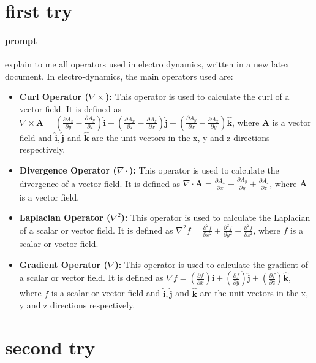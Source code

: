 \documentclass{article}
\begin{document}
\section{first try} %
\paragraph{prompt} %
explain to me all operators used in electro dynamics, written in a new latex document.
In electro-dynamics, the main operators used are:
\begin{itemize}
    \item \textbf{Curl Operator ($\nabla \times$):} This operator is used to calculate the curl of a vector field. It is defined as $\nabla \times \textbf{A}=\left(\frac{\partial A_z}{\partial y}-\frac{\partial A_y}{\partial z}\right)\hat{\textbf{i}} + \left(\frac{\partial A_x}{\partial z}-\frac{\partial A_z}{\partial x}\right)\hat{\textbf{j}} + \left(\frac{\partial A_y}{\partial x}-\frac{\partial A_x}{\partial y}\right)\hat{\textbf{k}}$, where $\textbf{A}$ is a vector field and $\hat{\textbf{i}},\hat{\textbf{j}}$ and $\hat{\textbf{k}}$ are the unit vectors in the x, y and z directions respectively. 
    \item \textbf{Divergence Operator ($\nabla \cdot$):} This operator is used to calculate the divergence of a vector field. It is defined as $\nabla \cdot \textbf{A}=\frac{\partial A_x}{\partial x}+\frac{\partial A_y}{\partial y}+\frac{\partial A_z}{\partial z}$, where $\textbf{A}$ is a vector field.
    \item \textbf{Laplacian Operator ($\nabla^2$):} This operator is used to calculate the Laplacian of a scalar or vector field. It is defined as $\nabla^2 f=\frac{\partial^2 f}{\partial x^2}+\frac{\partial^2 f}{\partial y^2}+\frac{\partial^2 f}{\partial z^2}$, where $f$ is a scalar or vector field.
    \item \textbf{Gradient Operator ($\nabla$):} This operator is used to calculate the gradient of a scalar or vector field. It is defined as $\nabla f=\left(\frac{\partial f}{\partial x}\right)\hat{\textbf{i}}+\left(\frac{\partial f}{\partial y}\right)\hat{\textbf{j}}+\left(\frac{\partial f}{\partial z}\right)\hat{\textbf{k}}$, where $f$ is a scalar or vector field and $\hat{\textbf{i}},\hat{\textbf{j}}$ and $\hat{\textbf{k}}$ are the unit vectors in the x, y and z directions respectively.
\end{itemize}

\section{second try} %
\end{document}

